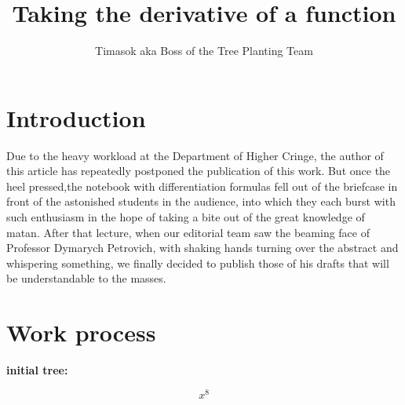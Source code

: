 \documentclass{article}
\title{\textbf{Taking the derivative of a function}}
\author{Timasok aka Boss of the Tree Planting Team}
\begin{document}
\maketitle
\section{Introduction}
Due to the heavy workload at the Department of Higher Cringe, the author of this article has repeatedly postponed the publication of this work. But once the heel pressed,the notebook with differentiation formulas fell out of the briefcase in front of the astonished students in the audience, into which they each burst with such enthusiasm in the hope of taking a bite out of the great knowledge of matan. After that lecture, when our editorial team saw the beaming face of Professor Dymarych Petrovich, with shaking hands turning over the abstract and whispering something, we finally decided to publish those of his drafts that will be understandable to the masses. 
\section{Work process}
\textbf{initial tree:}

$$
x^{8}
$$
\end{document}
